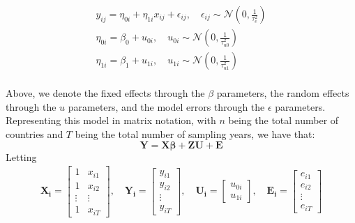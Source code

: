 \documentclass{article}
\begin{document}
\begin{gather*} 
y_{ij}=\eta_{0i}+\eta_{1i}x_{ij}+\epsilon_{ij}, \quad \epsilon_{ij} \sim \mathcal{N} \left( 0, \frac{1}{\tau_e^2} \right) \\ 
\eta_{0i} = \beta_{0} + u_{0i}, \quad u_{0i} \sim \mathcal{N} \left( 0, \frac{1}{\tau_{u0}^2} \right) \\
\eta_{1i} = \beta_{1} + u_{1i}, \quad u_{1i} \sim \mathcal{N} \left( 0, \frac{1}{\tau_{u1}^2} \right) \\
\end{gather*}

Above, we denote the fixed effects through the $\beta$ parameters, the random effects through the $u$ parameters, and the model errors through the $\epsilon$ parameters. Representing this model in matrix notation, with $n$ being the total number of countries and $T$ being the total number of sampling years, we have that:
\begin{equation} \label{eqn:adx_longmodel}
\mathbf{Y}=\mathbf{X}\boldsymbol{\beta}+\mathbf{ZU}+\mathbf{E}
\end{equation}
Letting
\begin{gather*}
\mathbf{X_{i}}=
\begin{bmatrix}
    1 & x_{i1} \\ 
    1 & x_{i2} \\ 
  	\vdots & \vdots\\ 
    1 & x_{iT}
\end{bmatrix}, \quad
\mathbf{Y_i}=
\begin{bmatrix}
    y_{i1} \\ 
    y_{i2} \\ 
  	\vdots \\ 
    y_{iT}
\end{bmatrix}, \quad
\mathbf{U_i}=
\begin{bmatrix}
    u_{0i} \\ 
    u_{1i}
\end{bmatrix}, \quad
\mathbf{E_i}=
\begin{bmatrix}
    e_{i1} \\ 
    e_{i2} \\ 
  	\vdots \\ 
    e_{iT}
\end{bmatrix}
\end{gather*}
\end{document}
